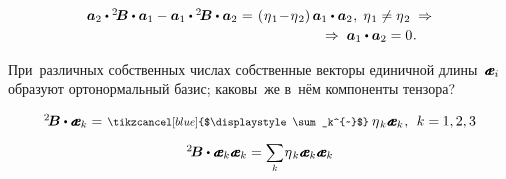 \begin{otherlanguage}{russian}
\nopagebreak\vspace{-0.1em}\begin{equation*}\begin{array}{c}
\tikzmark{BeginEqualsZeroBrace} {\bm{a}_2 \dotp {^2\!\bm{B}} \dotp \bm{a}_1 - \bm{a}_1 \dotp {^2\!\bm{B}} \dotp \bm{a}_2} \hspace{.1ex} \tikzmark{EndEqualsZeroBrace} = \hspace{.2ex} \left(\hspace{.1ex}{\eigenvalue_1 \!-\! \eigenvalue_2}\right) \bm{a}_1 \dotp \bm{a}_2 \hspace{.1ex} , \;
\eigenvalue_1 \neq \eigenvalue_2 \;\Rightarrow \\[0.2em]
\hspace{16em} \Rightarrow\; \bm{a}_1 \dotp \bm{a}_2 = 0 \hspace{.1ex}.
\end{array}\end{equation*}

\vspace{-0.64em} При~различных собственных числах собственные векторы единичной длины~${\mathboldae_i}$ образуют ортонормальный базис; каковы~же в~нём компоненты тензора?

\vspace{-0.1em}\[\begin{array}{c}
{^2\!\bm{B}} \dotp \mathboldae_k = \hspace{0.2ex} \scalebox{0.8}[0.8]{$\tikzcancel[blue]{$\displaystyle\sum_k^{~}$}$}\: \eigenvalue_k \mathboldae_k \hspace{0.1ex}, \:\: k =\hspace{-0.1ex} 1, 2, 3 \\[.9em]
%
{^2\!\bm{B}} \dotp \tikzmark{BeginEqualsEBrace} {\mathboldae_k \mathboldae_k} \tikzmark{EndEqualsEBrace} = \scalebox{0.9}[0.9]{$\displaystyle \sum_{\smash{k}}$} \hspace{0.1ex} \eigenvalue_k \mathboldae_k \mathboldae_k
\end{array}\]


\end{otherlanguage}
